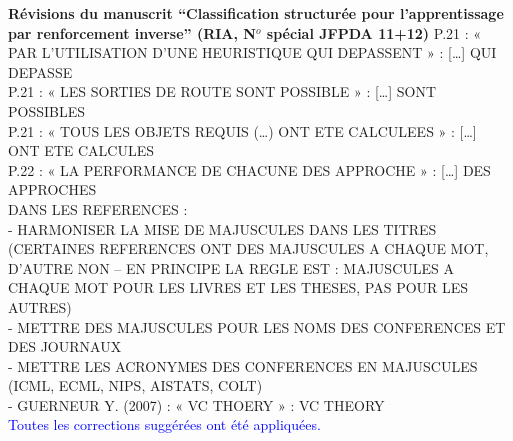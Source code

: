 \documentclass[11pt, a4paper]{letter}
\begin{document}
\begin{letter}{\large \textbf{Révisions du manuscrit ``Classification structurée pour l'apprentissage par renforcement inverse'' (RIA, N$^o$ spécial JFPDA 11+12)}}
P.21 : « PAR L’UTILISATION D’UNE HEURISTIQUE QUI DEPASSENT » : […] QUI DEPASSE\\
P.21 : « LES SORTIES DE ROUTE SONT POSSIBLE » : […] SONT POSSIBLES\\
P.21 : « TOUS LES OBJETS REQUIS (…) ONT ETE CALCULEES » : […] ONT ETE CALCULES\\
P.22 : « LA PERFORMANCE DE CHACUNE DES APPROCHE » : […] DES APPROCHES\\
DANS LES REFERENCES :\\
- HARMONISER LA MISE DE MAJUSCULES DANS LES TITRES (CERTAINES REFERENCES ONT DES MAJUSCULES
A CHAQUE MOT, D’AUTRE NON – EN PRINCIPE LA REGLE EST : MAJUSCULES A CHAQUE MOT POUR LES LIVRES
ET LES THESES, PAS POUR LES AUTRES)\\
- METTRE DES MAJUSCULES POUR LES NOMS DES CONFERENCES ET DES JOURNAUX\\
- METTRE LES ACRONYMES DES CONFERENCES EN MAJUSCULES (ICML, ECML, NIPS, AISTATS, COLT)\\
- GUERNEUR Y. (2007) : « VC THOERY » : VC THEORY\\
\textcolor{blue}{
Toutes les corrections suggérées ont été appliquées.
}


\end{letter}
\end{document}
